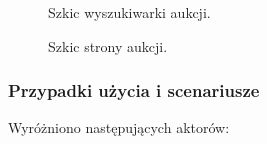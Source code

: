 \begin{figure}[h]
\centering
{}
\caption{Szkic wyszukiwarki aukcji.}
\label{mock2}
\end{figure}

\begin{figure}[h]
\centering
{}
\caption{Szkic strony aukcji.}
\label{mock3}
\end{figure}

\subsubsection{Przypadki użycia i scenariusze}

Wyróżniono następujących aktorów:

